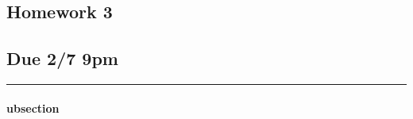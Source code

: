 \documentclass[../hw.tex]{subfiles}
\begin{document}
\begin{center}
  \section*{Homework 3} \label{sec:homework3}
  \subsection*{Due 2/7 9pm}
\end{center}
\hrule \vspace{10px}

\paragraph{ubsection}
\end{document}

